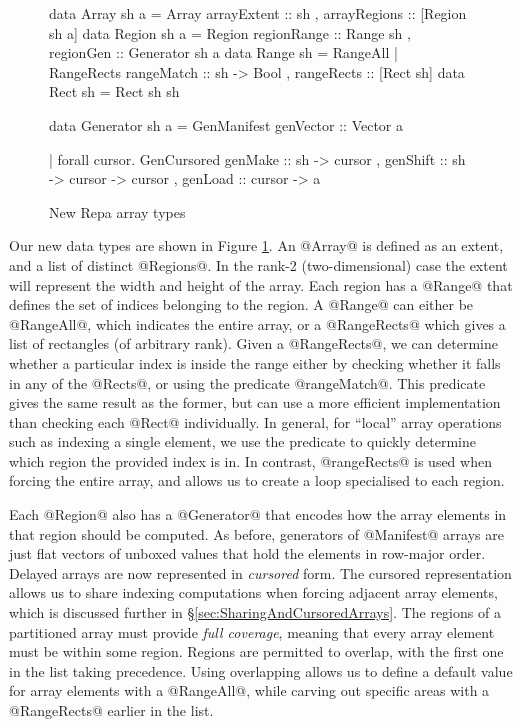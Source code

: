 \begin{figure}
\begin{small}
\begin{code}
data Array sh a
   = Array       { arrayExtent  :: sh
                 , arrayRegions :: [Region sh a] }
data Region sh a
   = Region      { regionRange  :: Range sh
                 , regionGen    :: Generator sh a }
data Range sh 
   = RangeAll
   | RangeRects  { rangeMatch   :: sh -> Bool
                 , rangeRects   :: [Rect sh] }
data Rect sh
   = Rect sh sh

data Generator sh a
   = GenManifest { genVector   :: Vector a }	
	
   | forall cursor. 
     GenCursored { genMake     :: sh -> cursor
                 , genShift    :: sh -> cursor -> cursor
                 , genLoad     :: cursor -> a }
\end{code}
\end{small}
\caption{New Repa array types}
\label{fig:NewRepaArrays}
\end{figure}


Our new data types are shown in Figure \ref{fig:NewRepaArrays}. An @Array@ is defined as an extent, and a list of distinct @Regions@. In the rank-2 (two-dimensional) case the extent will represent the width and height of the array. Each region has a @Range@ that defines the set of indices belonging to the region. A @Range@ can either be @RangeAll@, which indicates the entire array, or a @RangeRects@ which gives a list of rectangles (of arbitrary rank). Given a @RangeRects@, we can determine whether a particular index is inside the range either by checking whether it falls in any of the @Rects@, or using the predicate @rangeMatch@. This predicate gives the same result as the former, but can use a more efficient implementation than checking each @Rect@ individually. In general, for ``local'' array operations such as indexing a single element, we use the predicate to quickly determine which region the provided index is in. In contrast, @rangeRects@ is used when forcing the entire array, and allows us to create a loop specialised to each region. 

Each @Region@ also has a @Generator@ that encodes how the array elements in that region should be computed. As before, generators of @Manifest@ arrays are just flat vectors of unboxed values that hold the elements in row-major order. Delayed arrays are now represented in \emph{cursored} form. The cursored representation allows us to share indexing computations when forcing adjacent array elements, which is discussed further in \S\ref{sec:SharingAndCursoredArrays}. The regions of a partitioned array must provide \emph{full coverage}, meaning that every array element must be within some region. Regions are permitted to overlap, with the first one in the list taking precedence. Using overlapping allows us to define a default value for array elements with a @RangeAll@, while carving out specific areas with a @RangeRects@ earlier in the list.
 
